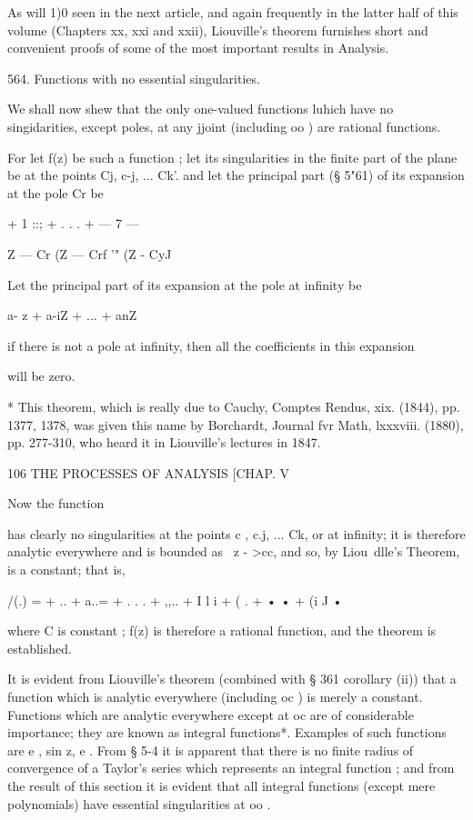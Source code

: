 {{{{As will 1)0 seen in the next article, and again frequently in the
latter half of this volume (Chapters xx, xxi and xxii), Liouville's
theorem furnishes short and convenient proofs of some of the most
important results in Analysis.

564. Functions with no essential singularities.

We shall now shew that the only one-valued functions luhich have no
singidarities, except poles, at any jjoint (including oo ) are
rational functions.

For let f(z) be such a function ; let its singularities in the finite
part of the plane be at the points Cj, c-j, ... Ck'. and let the
principal part (§ 5"61) of its expansion at the pole Cr be

+ 1 ::; + . . . + — 7 —



Z — Cr (Z — Crf '" (Z - CyJ

Let the principal part of its expansion at the pole at infinity be

a- z + a-iZ + ... + anZ \

if there is not a pole at infinity, then all the coefficients in this
expansion

will be zero.

* This theorem, which is really due to Cauchy, Comptes Rendus, xix.
(1844), pp. 1377, 1378, was given this name by Borchardt, Journal fvr
Math, lxxxviii. (1880), pp. 277-310, who heard it in Liouville's
lectures in 1847.



106 THE PROCESSES OF ANALYSIS [CHAP. V

Now the function

has clearly no singularities at the points c , c.j, ... Ck, or at
infinity; it is therefore analytic everywhere and is bounded as \ z -
>cc, and so, by Liou\ dlle's Theorem, is a constant; that is,

/(.) = + .. + a..= + . . . + ,,.. + I l i + ( . + • • + (i J •

where C is constant ; f(z) is therefore a rational function, and the
theorem is established.

It is evident from Liouville's theorem (combined with § 361 corollary
(ii)) that a function which is analytic everywhere (including oc ) is
merely a constant. Functions which are analytic everywhere except at
oc are of considerable importance; they are known as integral
functions*. Examples of such functions are e , sin z, e . From § 5-4
it is apparent that there is no finite radius of convergence of a
Taylor's series which represents an integral function ; and from the
result of this section it is evident that all integral functions
(except mere polynomials) have essential singularities at oo .

}}}}
